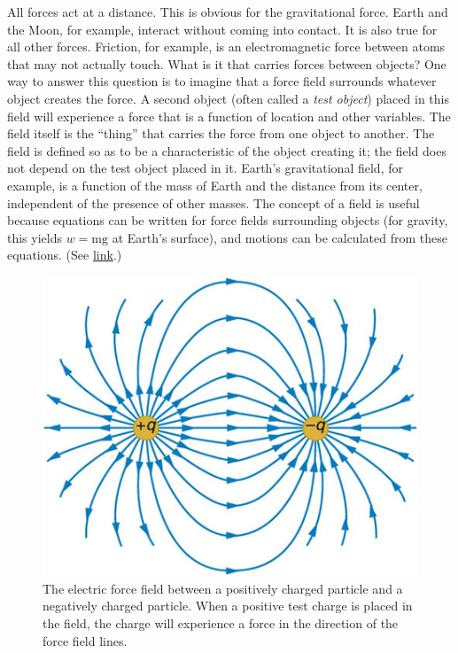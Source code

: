 \documentclass[
]{book}
\begin{document}
All forces act at a distance. This is obvious for the gravitational
force. Earth and the Moon, for example, interact without coming into
contact. It is also true for all other forces. Friction, for example, is
an electromagnetic force between atoms that may not actually touch. What
is it that carries forces between objects? One way to answer this
question is to imagine that a \protect\hypertarget{import-auto-id3093199}{}{force field} surrounds whatever object creates the force. A second
object (often called a \emph{test object}) placed in this field will
experience a force that is a function of location and other variables.
The field itself is the ``thing'' that carries the force from one object
to another. The field is defined so as to be a characteristic of the
object creating it; the field does not depend on the test object placed
in it. Earth's gravitational field, for example, is a function of the
mass of Earth and the distance from its center, independent of the
presence of other masses. The concept of a field is useful because
equations can be written for force fields surrounding objects (for
gravity, this yields \({w = \text{mg}}{}\) at Earth's surface), and
motions can be calculated from these equations. (See
\protect\hyperlink{import-auto-id1577565}{link}.)

\begin{figure}
\hypertarget{import-auto-id1577565}{%
\centering
\includegraphics{images/Figure_04_08_01.jpg}
\caption{The electric force field between a positively charged particle and a
negatively charged particle. When a positive test charge is placed in
the field, the charge will experience a force in the direction of the
force field lines.}\label{import-auto-id1577565}
}
\end{figure}
\end{document}
